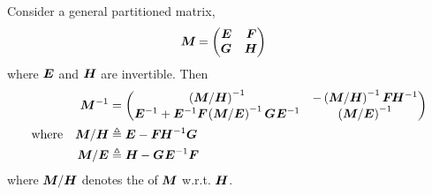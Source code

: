 \documentclass[11pt]{article}
\begin{document}
\newcommand{\scomp}[2]{\matr{#1} / \matr{#2}}
\newcommand{\scompinv}[2]{\left( \scomp{#1}{#2} \right)^{-1}}
\begin{definition}
	Consider a general partitioned matrix,
	\begin{align}
		\bm{M}_{} &= \begin{pmatrix}
			\bm{E}_{} & \bm{F}_{} \\
			\bm{G}_{} & \bm{H}_{} 
		\end{pmatrix}
	\end{align}
	where $\bm{E}_{}$ and $\bm{H}_{}$ are invertible. Then
	\begin{align}
		\minv{M} &= \begin{pmatrix}
			\scompinv{M}{H} & - \scompinv{M}{H} \matr F \minv{H} \\
			\minv{E} + \minv E \matr F \scompinv{M}{E} \matr G \minv{E} &
			\scompinv{M}{E}
		\end{pmatrix}\\
		\text{where}\quad
		\scomp{M}{H}
			&\triangleq \matr E - \matr F \minv H \matr G \\
		\scomp{M}{E}
			&\triangleq \matr H - \matr G \minv E \matr F
	\end{align}
	where $\scomp{M}{H}$ denotes the  of $\bm{M}_{}$ w.r.t. $\bm{H}_{}$. 
\end{definition}
\end{document}

